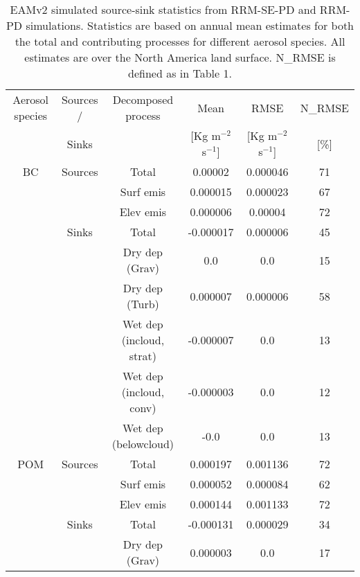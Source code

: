 \documentclass[journal abbreviation, manuscript]{copernicus}
\begin{document}
\clearpage
\begin{table}
\linespread{1.5}
\caption{EAMv2 simulated source-sink statistics from RRM-SE-PD and RRM-PD simulations. Statistics are based on annual mean estimates for both the total and contributing processes for different aerosol species. All estimates are over the North America land surface. N\_RMSE is defined as in Table 1.}
\centering
\begin{tabular}{c|c|c|c|c|c}%
\hline
Aerosol species & Sources / & Decomposed process &         Mean &         RMSE & N\_RMSE \\
             &    Sinks &                 & [Kg m$^{-2}$ s$^{-1}$] & [Kg m$^{-2}$ s$^{-1}$] &    [\%] \\ \hline
             BC & Sources &              Total &      0.00002 &     0.000046 &     71 \\
             &      &          Surf emis &     0.000015 &     0.000023 &     67 \\
             &      &          Elev emis &     0.000006 &      0.00004 &     72 \\ \hline
             &   Sinks &              Total &    -0.000017 &     0.000006 &     45 \\
             &      &     Dry dep (Grav) &          0.0 &          0.0 &     15 \\
             &      &     Dry dep (Turb) &     0.000007 &     0.000006 &     58 \\
             &      &            Wet dep (incloud, strat) &    -0.000007 &          0.0 &     13 \\
             &      &            Wet dep (incloud, conv) &    -0.000003 &          0.0 &     12 \\
             &      &            Wet dep (belowcloud)  &         -0.0 &          0.0 &     13 \\ \hline
            POM & Sources &              Total &     0.000197 &     0.001136 &     72 \\
             &      &          Surf emis &     0.000052 &     0.000084 &     62 \\
             &      &          Elev emis &     0.000144 &     0.001133 &     72 \\ \hline
                           &   Sinks &              Total &    -0.000131 &     0.000029 &     34 \\
             &      &     Dry dep (Grav) &     0.000003 &          0.0 &     17 \\

\end{tabular}
\end{table}
\end{document}
